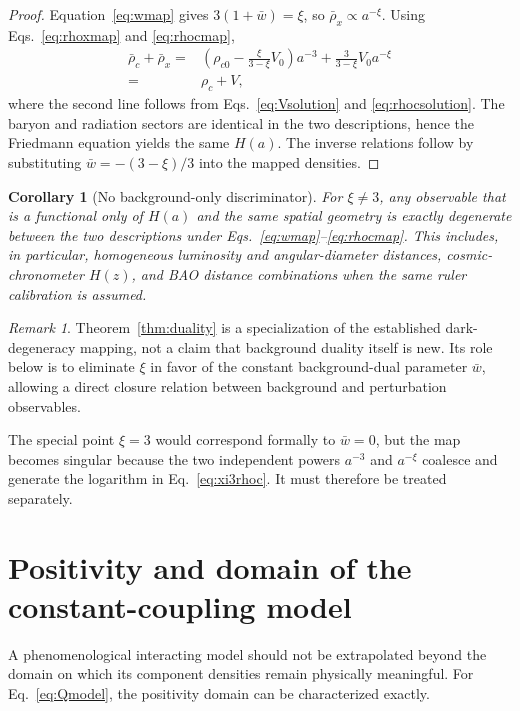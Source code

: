 \documentclass[11pt]{article}
\newtheorem{corollary}[theorem]{Corollary}
\theoremstyle{remark}
\newtheorem{remark}[theorem]{Remark}
\begin{document}
\begin{proof}
Equation~\eqref{eq:wmap} gives
$3(1+\bar w)=\xi$, so $\bar\rho_x\propto a^{-\xi}$.
Using Eqs.~\eqref{eq:rhoxmap} and \eqref{eq:rhocmap},
\begin{align}
    \bar\rho_c+\bar\rho_x
    =&\left(\rho_{c0}-\frac{\xi}{3-\xi}V_0\right)a^{-3}
    +\frac{3}{3-\xi}V_0a^{-\xi}\nonumber\\
    =&\rho_c+V,
\end{align}
where the second line follows from Eqs.~\eqref{eq:Vsolution} and \eqref{eq:rhocsolution}.  The baryon and radiation sectors are identical in the two descriptions, hence the Friedmann equation yields the same $H(a)$.  The inverse relations follow by substituting $\bar w=-(3-\xi)/3$ into the mapped densities.
\end{proof}

\begin{corollary}[No background-only discriminator]
\label{cor:background}
For $\xi\neq3$, any observable that is a functional only of $H(a)$ and the same spatial geometry is exactly degenerate between the two descriptions under Eqs.~\eqref{eq:wmap}--\eqref{eq:rhocmap}.  This includes, in particular, homogeneous luminosity and angular-diameter distances, cosmic-chronometer $H(z)$, and BAO distance combinations when the same ruler calibration is assumed.
\end{corollary}

\begin{remark}
Theorem~\ref{thm:duality} is a specialization of the established dark-degeneracy mapping, not a claim that background duality itself is new.  Its role below is to eliminate $\xi$ in favor of the constant background-dual parameter $\bar w$, allowing a direct closure relation between background and perturbation observables.
\end{remark}

The special point $\xi=3$ would correspond formally to $\bar w=0$, but the map becomes singular because the two independent powers $a^{-3}$ and $a^{-\xi}$ coalesce and generate the logarithm in Eq.~\eqref{eq:xi3rhoc}.  It must therefore be treated separately.

\section{Positivity and domain of the constant-coupling model}
\label{sec:positivity}

A phenomenological interacting model should not be extrapolated beyond the domain on which its component densities remain physically meaningful.  For Eq.~\eqref{eq:Qmodel}, the positivity domain can be characterized exactly.
\end{document}
